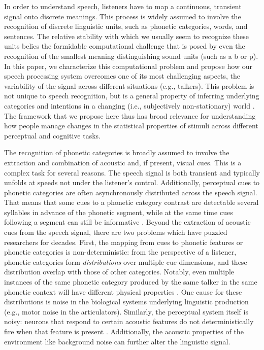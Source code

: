 In order to understand speech, listeners have to map a continuous, transient signal onto discrete meanings. This process is widely assumed to involve the recognition of discrete linguistic units, such as phonetic categories, words, and sentences. The relative stability with which we usually seem to recognize these units belies the formidable computational challenge that is posed by even the recognition of the smallest meaning distinguishing sound units (such as a \ph b or \ph p). In this paper, we characterize this computational problem and propose how our speech processing system overcomes one of its most challenging aspects, the variability of the signal across different situations (e.g., talkers).
This problem is not unique to speech recognition, but is a general property of inferring underlying categories and intentions in a changing (i.e., subjectively non-stationary) world \autocite[see references in][]{Qian2012}.
The framework that we propose here thus has broad relevance for understanding how people manage changes in the statistical properties of stimuli across different perceptual and cognitive tasks.

The recognition of phonetic categories is broadly assumed to involve the extraction and combination of acoustic and, if present, visual cues. This is a complex task for several reasons. The speech signal is both transient and typically unfolds at speeds not under the listener's control. 
Additionally, perceptual cues to phonetic categories are often asynchronously distributed across the speech signal. That means that some cues to a phonetic category contrast are detectable several syllables in advance of the phonetic segment, while at the same time cues following a segment can still be informative \autocite[e.g., rhoticity,][]{Heid2000,Tunley1999}.  Beyond the extraction of acoustic cues from the speech signal, there are two problems which have puzzled researchers for decades. First, the mapping from cues to phonetic features or phonetic categories is non-deterministic: from the perspective of a listener, phonetic categories form \emph{distributions} over multiple cue dimensions, and these distribution overlap with those of other categories. Notably, even multiple instances of the same phonetic category produced by the same talker in the same phonetic context will have different physical properties \autocite{Allen2003,Newman2001}.  One cause for these distributions is noise in the biological systems underlying linguistic production (e.g., motor noise in the articulators). Similarly, the perceptual system itself is noisy: neurons that respond to certain acoustic features do not deterministically fire when that feature is present \autocite{Ma2006}. Additionally, the acoustic properties of the environment like background noise can further alter the linguistic signal.

